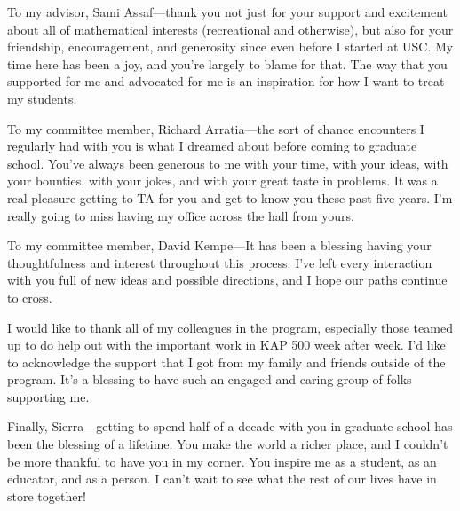 To my advisor, Sami Assaf---thank you not just for your support and excitement
about all of mathematical interests (recreational and otherwise), but also for your
friendship, encouragement, and generosity since even before I started at USC.
My time here has been a joy, and you're largely to blame for that.
The way that you supported for me and advocated for me is
an inspiration for how I want to treat my students.

To my committee member, Richard Arratia---the sort of chance encounters I
regularly had with you is what I dreamed about before coming to graduate school.
You've always been generous to me with your time, with your ideas, with your
bounties, with your jokes, and with your great taste in problems.
It was a real pleasure getting to TA for you and get to know you these past five years.
I'm really going to miss having my office across the hall from yours.

To my committee member, David Kempe---It has been a blessing having your
thoughtfulness and interest throughout this process.
I've left every interaction with you full of new ideas and possible directions,
and I hope our paths continue to cross.

I would like to thank all of my colleagues in the program, especially those
teamed up to do help out with the important work in KAP 500 week after week.
I'd like to acknowledge the support that I got from my family and friends
outside of the program. It's a blessing to have such an engaged and caring
group of folks supporting me.

Finally, Sierra---getting to spend half of a decade with you in graduate school
has been the blessing of a lifetime. You make the world a richer place, and I
couldn't be more thankful to have you in my corner.
You inspire me as a student, as an educator, and as a person.
I can't wait to see what the rest of our lives have in store together!
